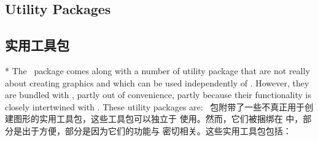 \begin{paracol}{2}
\subsection{Utility Packages}
\switchcolumn
\subsection{实用工具包}
\switchcolumn[0]*
The \pgfname\ package comes along with a number of utility package that are not
really about creating graphics and which can be used independently of \pgfname.
However, they are bundled with \pgfname, partly out of convenience, partly
because their functionality is closely intertwined with \pgfname. These utility
packages are:
\switchcolumn
\pgfname\ 包附带了一些不真正用于创建图形的实用工具包，这些工具包可以独立于 \pgfname 使用。然而，它们被捆绑在 \pgfname 中，部分是出于方便，部分是因为它们的功能与 \pgfname 密切相关。这些实用工具包包括：
\end{paracol}
%
